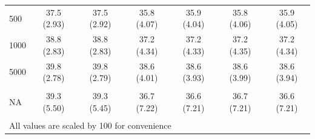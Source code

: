 \documentclass[AMA,STIX1COL,doublespace]{WileyNJD-v2}
\begin{document}
\begin{table}
\begin{tabular}[t]{lcccccc}
\hspace{1em}500 & 37.5 (2.93) & 37.5 (2.92) & 35.8 (4.07) & 35.9 (4.04) & 35.8 (4.06) & 35.9 (4.05)\\
\hspace{1em}1000 & 38.8 (2.83) & 38.8 (2.83) & 37.2 (4.34) & 37.2 (4.33) & 37.2 (4.35) & 37.2 (4.34)\\
\hspace{1em}5000 & 39.8 (2.78) & 39.8 (2.79) & 38.6 (4.01) & 38.6 (3.93) & 38.6 (3.99) & 38.6 (3.94)\\
\addlinespace[0.75em]
\multicolumn{7}{l}{\textbf{Overall}}\\
\hline
\hspace{1em}NA & 39.3 (5.50) & 39.3 (5.45) & 36.7 (7.22) & 36.6 (7.21) & 36.7 (7.21) & 36.6 (7.21)\\
\bottomrule
\multicolumn{7}{l}{\textsuperscript{} All values are scaled by 100 for convenience}\\
\end{tabular}
\end{table}
\end{document}
